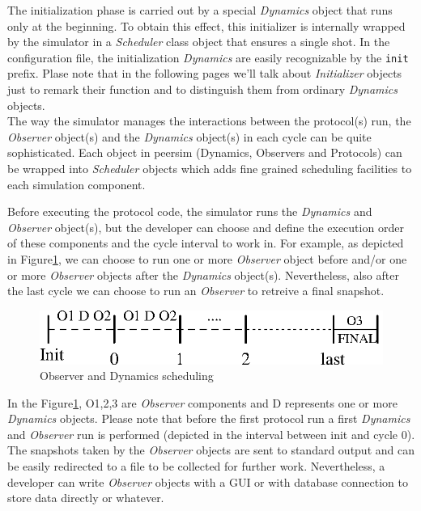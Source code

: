 \documentclass[a4paper,11pt]{article}
\begin{document}
The initialization phase is carried out by a special \emph{Dynamics}
object that runs only at the beginning. To obtain this effect, this
initializer is internally wrapped by the simulator in a \emph{Scheduler} 
class object that ensures a single shot. In the configuration file,
the initialization \emph{Dynamics} are easily recognizable by the
\texttt{init} prefix. Plase note that in the following pages we'll
talk about \emph{Initializer} objects just to remark their function and
to distinguish them from ordinary \emph{Dynamics} objects.\\
The way the simulator manages the interactions between the protocol(s)
run, the \emph{Observer} object(s) and the \emph{Dynamics} object(s)
in each cycle can be quite sophisticated. Each object in peersim 
(Dynamics, Observers and Protocols) can be wrapped into \emph{Scheduler} 
objects which adds fine grained scheduling facilities to each
simulation component.

Before executing the protocol code, the simulator runs the \emph{Dynamics}
and \emph{Observer} object(s), but the developer can choose and define
the execution order of these components and the cycle interval to
work in. For example, as depicted in Figure\ref{obsfigure}, we can
choose to run one or more \emph{Observer} object before and/or one
or more \emph{Observer} objects after the \emph{Dynamics} object(s).
Nevertheless, also after the last cycle we can choose to run an \emph{Observer}
to retreive a final snapshot.


\begin{figure}
\begin{center}
\includegraphics[scale=1.1]{scheduling.eps}
\end{center}
\caption{Observer and Dynamics scheduling\label{obsfigure}}
\end{figure}


In the Figure\ref{obsfigure}, O1,2,3 are \emph{Observer} components
and D represents one or more \emph{Dynamics} objects. Please note
that before the first protocol run a first \emph{Dynamics} and \emph{Observer}
run is performed (depicted in the interval between init and cycle
0). The snapshots taken by the \emph{Observer} objects are sent to
standard output and can be easily redirected to a file to be collected
for further work. Nevertheless, a developer can write \emph{Observer}
objects with a GUI or with database connection to store data directly
or whatever.
\end{document}
